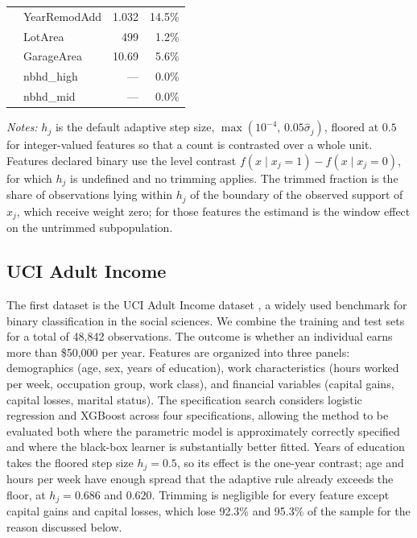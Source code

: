 \documentclass[12pt]{article}
\begin{document}
\begin{table}[htbp]
\begin{threeparttable}
\begin{tabular}{llrr}
			& YearRemodAdd & 1.032 & 14.5\% \\
			& LotArea & 499 & 1.2\% \\
			& GarageArea & 10.69 & 5.6\% \\
			& nbhd\_high & --- & 0.0\% \\
			& nbhd\_mid & --- & 0.0\% \\
			\bottomrule
			\end{tabular}
			\begin{tablenotes}
			\footnotesize
			\item \textit{Notes:} $h_j$ is the default adaptive step size, $\max(10^{-4},\, 0.05\hat{\sigma}_j)$, floored at $0.5$ for integer-valued features so that a count is contrasted over a whole unit. Features declared binary use the level contrast $f(x \mid x_j=1) - f(x \mid x_j=0)$, for which $h_j$ is undefined and no trimming applies. The trimmed fraction is the share of observations lying within $h_j$ of the boundary of the observed support of $x_j$, which receive weight zero; for those features the estimand is the window effect on the untrimmed subpopulation.
			\end{tablenotes}
		\end{threeparttable}
		\end{table}
	
	\subsection{UCI Adult Income}
	
	The first dataset is the UCI Adult Income dataset \citep{UCI, kohavi1996}, a widely used benchmark for binary classification in the social sciences. We combine the training and test sets for a total of 48,842 observations. The outcome is whether an individual earns more than \$50,000 per year. Features are organized into three panels: demographics (age, sex, years of education), work characteristics (hours worked per week, occupation group, work class), and financial variables (capital gains, capital losses, marital status). The specification search considers logistic regression and XGBoost across four specifications, allowing the method to be evaluated both where the parametric model is approximately correctly specified and where the black-box learner is substantially better fitted. Years of education takes the floored step size $h_j = 0.5$, so its effect is the one-year contrast; age and hours per week have enough spread that the adaptive rule already exceeds the floor, at $h_j = 0.686$ and $0.620$. Trimming is negligible for every feature except capital gains and capital losses, which lose 92.3\% and 95.3\% of the sample for the reason discussed below.
	
\end{document}
